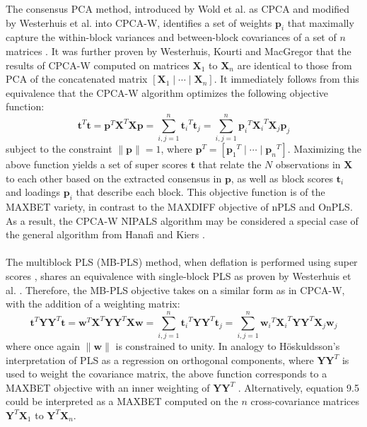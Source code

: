 \begin{doublespace}
The consensus PCA method, introduced by Wold et al. as CPCA and modified by
Westerhuis et al. into CPCA-W, identifies a set of weights $\mathbf{p}_i$
that maximally capture the within-block variances and between-block
covariances of a set of $n$ matrices \cite{westerhuis:jchemo1998}. It was
further proven by Westerhuis, Kourti and MacGregor that the results of CPCA-W
computed on matrices $\mathbf{X}_1$ to $\mathbf{X}_n$ are identical to those
from PCA of the concatenated matrix $[\mathbf{X}_1\mid\cdots\mid\mathbf{X}_n]$.
It immediately follows from this equivalence that the CPCA-W algorithm
optimizes the following objective function:
\begin{equation}
\mathbf{t}^T \mathbf{t} =
\mathbf{p}^T \mathbf{X}^T \mathbf{X} \mathbf{p} =
\sum_{i,j=1}^n {\mathbf{t}_i}^T \mathbf{t}_j =
\sum_{i,j=1}^n {\mathbf{p}_i}^T {\mathbf{X}_i}^T \mathbf{X}_j \mathbf{p}_j
\end{equation}
subject to the constraint $\|\mathbf{p}\|=1$, where
$\mathbf{p}^T=[{\mathbf{p}_1}^T\mid\cdots\mid{\mathbf{p}_n}^T]$. Maximizing
the above function yields a set of super scores $\mathbf{t}$ that relate the
$N$ observations in $\mathbf{X}$ to each other based on the extracted
consensus in $\mathbf{p}$, as well as block scores $\mathbf{t}_i$ and loadings
$\mathbf{p}_i$ that describe each block. This objective function is of the
MAXBET variety, in contrast to the MAXDIFF objective of nPLS and OnPLS. As
a result, the CPCA-W NIPALS algorithm may be considered a special case of
the general algorithm from Hanafi and Kiers \cite{hanafi:csda2006}.
\\\\
The multiblock PLS (MB-PLS) method, when deflation is performed using super
scores \cite{westerhuis:jchemo1997}, shares an equivalence with single-block
PLS as proven by Westerhuis et al. \cite{westerhuis:jchemo1998}. Therefore,
the MB-PLS objective takes on a similar form as in CPCA-W, with the addition
of a weighting matrix:
\begin{equation}
\mathbf{t}^T \mathbf{Y} \mathbf{Y}^T \mathbf{t} =
\mathbf{w}^T \mathbf{X}^T \mathbf{Y} \mathbf{Y}^T \mathbf{X} \mathbf{w} =
\sum_{i,j=1}^n
 {\mathbf{t}_i}^T \mathbf{Y} \mathbf{Y}^T \mathbf{t}_j =
\sum_{i,j=1}^n
 {\mathbf{w}_i}^T {\mathbf{X}_i}^T
  \mathbf{Y} \mathbf{Y}^T
 \mathbf{X}_j \mathbf{w}_j
\end{equation}
where once again $\|\mathbf{w}\|$ is constrained to unity. In analogy to
H\"{o}skuldsson's interpretation of PLS as a regression on orthogonal
components, where $\mathbf{Y}\mathbf{Y}^T$ is used to weight the covariance
matrix, the above function corresponds to a MAXBET objective with an inner
weighting of $\mathbf{Y}\mathbf{Y}^T$ \cite{hoskuldsson:jchemo1988}.
Alternatively, equation 9.5 could be interpreted as a MAXBET computed on the
$n$ cross-covariance matrices $\mathbf{Y}^T \mathbf{X}_1$ to
$\mathbf{Y}^T \mathbf{X}_n$.
\end{doublespace}

